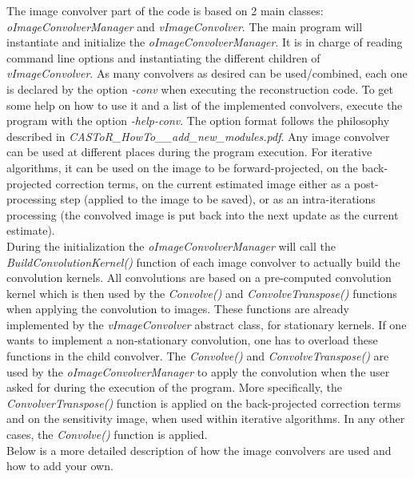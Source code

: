 \documentclass[a4paper, 11pt]{article}
\begin{document}
The image convolver part of the code is based on 2 main classes: \textit{oImageConvolverManager} and \textit{vImageConvolver}. The main program will instantiate
and initialize the \textit{oImageConvolverManager}. It is in charge of reading command line options and instantiating the different children of \textit{vImageConvolver}.
As many convolvers as desired can be used/combined, each one is declared by the option \textit{-conv} when executing the reconstruction code. To get some help on how to use it and a list of the implemented
convolvers, execute the program with the option \textit{-help-conv}. The option format follows the philosophy described in \textit{CASToR\_HowTo\_\_add\_new\_modules.pdf}.
Any image convolver can be used at different places during the program execution. For iterative algorithms, it can be used on the image to be forward-projected,
on the back-projected correction terms, on the current estimated image either as a post-processing step (applied to the image to be saved), or as an intra-iterations
processing (the convolved image is put back into the next update as the current estimate).\\

During the initialization the \textit{oImageConvolverManager} will call the \textit{BuildConvolutionKernel()} function of each image convolver to actually build the
convolution kernels. All convolutions are based on a pre-computed convolution kernel which is then used by the \textit{Convolve()} and \textit{ConvolveTranspose()}
functions when applying the convolution to images. These functions are already implemented by the \textit{vImageConvolver} abstract class, for stationary kernels. If
one wants to implement a non-stationary convolution, one has to overload these functions in the child convolver. The \textit{Convolve()} and \textit{ConvolveTranspose()}
are used by the \textit{oImageConvolverManager} to apply the convolution when the user asked for during the execution of the program. More specifically, the
\textit{ConvolverTranspose()} function is applied on the back-projected correction terms and on the sensitivity image, when used within iterative algorithms. In any
other cases, the \textit{Convolve()} function is applied.\\

Below is a more detailed description of how the image convolvers are used and how to add your own.

\end{document}
